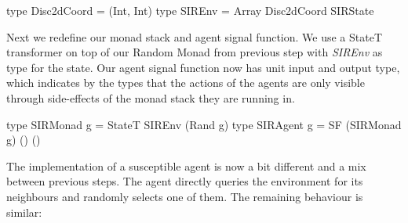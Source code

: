\begin{HaskellCode}
type Disc2dCoord = (Int, Int)
type SIREnv      = Array Disc2dCoord SIRState
\end{HaskellCode}

Next we redefine our monad stack and agent signal function. We use a StateT transformer on top of our Random Monad from previous step with \textit{SIREnv} as type for the state. Our agent signal function now has unit input and output type, which indicates by the types that the actions of the agents are only visible through side-effects of the monad stack they are running in.

\begin{HaskellCode}
type SIRMonad g = StateT SIREnv (Rand g)
type SIRAgent g = SF (SIRMonad g) () ()
\end{HaskellCode}

The implementation of a susceptible agent is now a bit different and a mix between previous steps. The agent directly queries the environment for its neighbours and randomly selects one of them. The remaining behaviour is similar:

